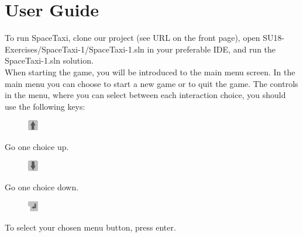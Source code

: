 \documentclass[../master.tex]{subfiles}
\begin{document}
\section{User Guide}
To run SpaceTaxi, clone our project (see URL on the front page), open SU18-Exercises/SpaceTaxi-1/SpaceTaxi-1.sln in your preferable IDE, and run the SpaceTaxi-1.sln solution.\\

When starting the game, you will be introduced to the main menu screen. In the main menu you can choose to start a new game or to quit the game. The controls in the menu, where you can select between each interaction choice, you should use the following keys:\\
\begin{figure}
	\vspace{-6.9mm}
	\begin{centering}
		\includegraphics[width=0.04\textwidth]{./Pictures/Pil_op.png}
	\end{centering}
	\vspace{-6mm}
\end{figure}
Go one choice up.\\

\begin{figure}
	\vspace{-6.9mm}
	\begin{centering}
		\includegraphics[width=0.04\textwidth]{./Pictures/Pil_ned.png}
	\end{centering}
	\vspace{-6mm}
\end{figure}
Go one choice down.\\

\begin{figure}
	\vspace{-6.9mm}
	\begin{centering}
		\includegraphics[width=0.04\textwidth]{./Pictures/Enter.png}
	\end{centering}
	\vspace{-6mm}
\end{figure}
To select your chosen menu button, press enter.\\
\end{document}
